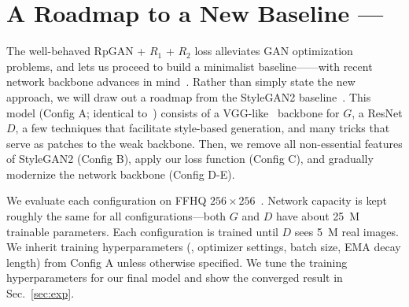 

\section{A Roadmap to a New Baseline --- \modelName}
\label{sec:roadmap}



The well-behaved RpGAN + $R_1$ + $R_2$ loss alleviates GAN optimization problems, and lets us proceed to build a minimalist baseline---\modelName---with recent network backbone advances in mind~\cite{convnext,metaformer}. Rather than simply state the new approach, we will draw out a roadmap from the StyleGAN2 baseline~\cite{sg2ada}. This model (Config A; identical to~\cite{sg2ada}) consists of a VGG-like~\cite{vgg} backbone for $G$, a ResNet $D$, a few techniques that facilitate style-based generation, and many tricks that serve as patches to the weak backbone. Then, we remove all non-essential features of StyleGAN2 (Config B), apply our loss function (Config C), and gradually modernize the network backbone (Config D-E).


We evaluate each configuration on FFHQ $256\times256$~\cite{sg1}. Network capacity is kept roughly the same for all configurations---both $G$ and $D$ have about 25\ M trainable parameters. Each configuration is trained until $D$ sees 5\ M real images. We inherit training hyperparameters (\eg, optimizer settings, batch size, EMA decay length) from Config A unless otherwise specified. We tune the training hyperparameters for our final model and show the converged result in Sec.~\ref{sec:exp}.


